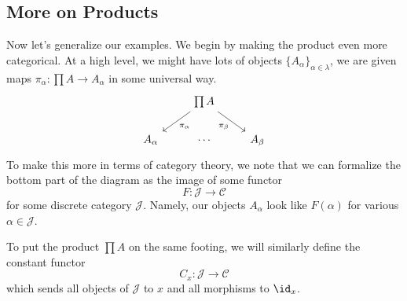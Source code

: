 \subsection{More on Products}
Now let's generalize our examples. We begin by making the product even more categorical. At a high level, we might have lots of objects $\{A_\alpha\}_{\alpha\in\lambda}$, we are given maps $\pi_\alpha:\prod A\to A_\alpha$ in some universal way.
\[\begin{tikzcd}
	& {\prod A} \\
	{A_\alpha} & \cdots & {A_\beta}
	\arrow["{\pi_\alpha}", from=1-2, to=2-1]
	\arrow["{\pi_\beta}"', from=1-2, to=2-3]
\end{tikzcd}\]
To make this more in terms of category theory, we note that we can formalize the bottom part of the diagram as the image of some functor
\[F:\mathcal J\to\mathcal C\]
for some discrete category $\mathcal J$. Namely, our objects $A_\alpha$ look like $F(\alpha)$ for various $\alpha\in\mathcal J$.

To put the product $\prod A$ on the same footing, we will similarly define the constant functor
\[C_x:\mathcal J\to\mathcal C\]
which sends all objects of $\mathcal J$ to $x$ and all morphisms to $\id_x$.

